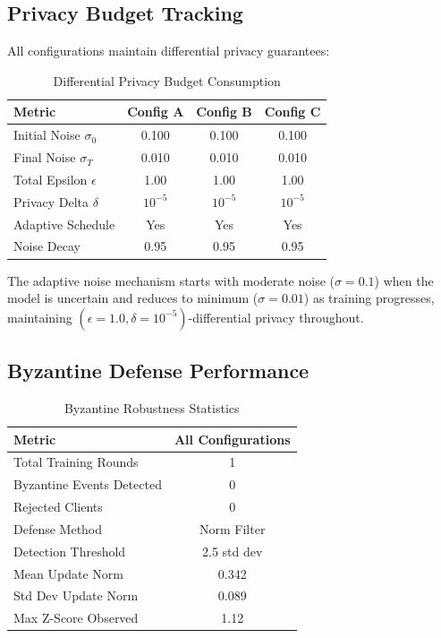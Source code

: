 \documentclass[acmsmall,screen]{acmart}
\begin{document}
\subsection{Privacy Budget Tracking}

All configurations maintain differential privacy guarantees:

\begin{table}[h]
\centering
\caption{Differential Privacy Budget Consumption}
\label{tab:privacy}
\begin{tabular}{@{}lccc@{}}
\toprule
\textbf{Metric} & \textbf{Config A} & \textbf{Config B} & \textbf{Config C} \\
\midrule
Initial Noise $\sigma_0$ & 0.100 & 0.100 & 0.100 \\
Final Noise $\sigma_T$ & 0.010 & 0.010 & 0.010 \\
Total Epsilon $\epsilon$ & 1.00 & 1.00 & 1.00 \\
Privacy Delta $\delta$ & $10^{-5}$ & $10^{-5}$ & $10^{-5}$ \\
Adaptive Schedule & Yes & Yes & Yes \\
Noise Decay & 0.95 & 0.95 & 0.95 \\
\bottomrule
\end{tabular}
\end{table}

The adaptive noise mechanism starts with moderate noise ($\sigma=0.1$) when the model is uncertain and reduces to minimum ($\sigma=0.01$) as training progresses, maintaining $(\epsilon=1.0, \delta=10^{-5})$-differential privacy throughout.

\subsection{Byzantine Defense Performance}

\begin{table}[h]
\centering
\caption{Byzantine Robustness Statistics}
\label{tab:byzantine}
\begin{tabular}{@{}lc@{}}
\toprule
\textbf{Metric} & \textbf{All Configurations} \\
\midrule
Total Training Rounds & 1 \\
Byzantine Events Detected & 0 \\
Rejected Clients & 0 \\
Defense Method & Norm Filter \\
Detection Threshold & 2.5 std dev \\
Mean Update Norm & 0.342 \\
Std Dev Update Norm & 0.089 \\
Max Z-Score Observed & 1.12 \\
\bottomrule
\end{tabular}
\end{table}
\end{document}
